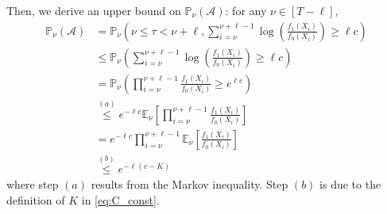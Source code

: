 \documentclass[12pt]{interact}
\newcommand{\lp}{\left(}
\newcommand{\rp}{\right)}
\newcommand{\lb}{\left[}
\newcommand{\rb}{\right]}
\newcommand{\mcal}{\mathcal}
\newcommand{\E}{\mathbb{E}}
\renewcommand{\Pr}{\mathbb{P}}
\theoremstyle{plain}
\begin{document}
Then, we derive an upper bound on $\Pr_{\nu}\lp\mcal{A}\rp$: for any $\nu\in\lb T-\ell \rb$,
%
\begin{align}
\Pr_{\nu}\lp\mcal{A}\rp
&=\Pr_{\nu}\lp\nu\leq\tau<\nu+\ell,\sum_{i=\nu}^{\nu+\ell-1}\log\lp\frac{f_{1}\lp X_{i}\rp}{f_{0}\lp X_{i}\rp}\rp\geq \ell c\rp \nonumber\\
&\leq\Pr_{\nu}\lp\sum_{i=\nu}^{\nu+\ell-1}\log\lp\frac{f_{1}\lp X_{i}\rp}{f_{0}\lp X_{i}\rp}\rp\geq \ell c\rp \nonumber\\
&=\Pr_{\nu}\lp\prod_{i=\nu}^{\nu+\ell-1}\frac{f_{1}\lp X_{i}\rp}{f_{0}\lp X_{i}\rp}\geq e^{\ell c}\rp \nonumber\\
&\overset{(a)}{\leq}e^{-\ell c}\E_{\nu}\lb\prod_{i=\nu}^{\nu+\ell-1}\frac{f_{1}\lp X_{i}\rp}{f_{0}\lp X_{i}\rp}\rb \nonumber\\
&=e^{-\ell c}\prod_{i=\nu}^{\nu+\ell-1}\E_{\nu}\lb\frac{f_{1}\lp X_{i}\rp}{f_{0}\lp X_{i}\rp}\rb \nonumber\\
&\overset{(b)}{\leq}e^{-\ell\lp c-K\rp}\label{eq:thm_1_sketch_3}
\end{align}
%
where step $(a)$ results from the Markov inequality.
Step $(b)$ is due to the definition of $K$ in \eqref{eq:C_const}.
\end{document}

